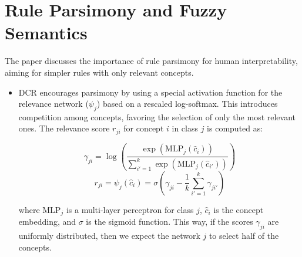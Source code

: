 \documentclass[10pt, oneside]{article}
\begin{document}
\section{Rule Parsimony and Fuzzy Semantics}
The paper \cite{dcr} discusses the importance of rule parsimony for human interpretability, aiming for simpler rules with only relevant concepts.

\begin{itemize}
   \item DCR encourages parsimony by using a special activation function for the relevance network ($\psi_j$) based on a rescaled log-softmax. This introduces competition among concepts, favoring the selection of only the most relevant ones. The relevance score $r_{ji}$ for concept $i$ in class $j$ is computed as:
   
   \begin{equation}
      \gamma_{ji} = \log \left( \frac{\exp(\text{MLP}_j(\hat{c}_i))}{\sum_{i'=1}^k \exp(\text{MLP}_j(\hat{c}_{i'}))} \right)
   \end{equation}
   \begin{equation}
      r_{ji} = \psi_j(\hat{c}_i) = \sigma \left( \gamma_{ji} - \frac{1}{k} \sum_{i'=1}^k \gamma_{ji'} \right)
   \end{equation}
   
   where $\text{MLP}_j$ is a multi-layer perceptron for class $j$, $\hat{c}_i$ is the concept embedding, and $\sigma$ is the sigmoid function. 
   This way, if the scores $\gamma_{ji}$ are uniformly distributed, then we expect the network $j$ to select half of the concepts. 


\end{itemize}
\end{document}
